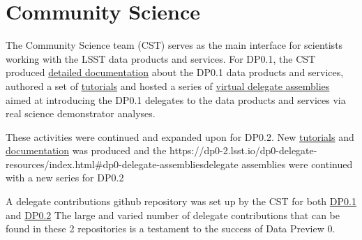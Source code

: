 \section{Community Science} \label{sec:cst}

The Community Science team (CST) serves as the main interface for scientists working with the LSST data products and services. 
For DP0.1, the CST produced \href{https://dp0-1.lsst.io/}{detailed documentation} about the DP0.1 data products and services, authored a set of \href{https://github.com/rubin-dp0/tutorial-notebooks}{tutorials} and hosted a series of \href{https://dp0-1.lsst.io/dp0-delegate-resources/index.html\#dp0-delegate-assemblies}{virtual delegate assemblies} aimed at introducing the DP0.1 delegates to the data products and services via real science demonstrator analyses.

These activities were continued and expanded upon for DP0.2. 
New \href{https://github.com/rubin-dp0/tutorial-notebooks}{tutorials} and  \href{dp0-2.lsst.io}{documentation} was produced  and the {https://dp0-2.lsst.io/dp0-delegate-resources/index.html\#dp0-delegate-assemblies}{delegate assemblies} were continued with a new series for DP0.2

A delegate contributions github repository was set up by the CST for both \href{https://github.com/rubin-dp0/delegate-contributions-dp01}{DP0.1} and \href{https://github.com/rubin-dp0/delegate-contributions-dp02}{DP0.2}
The large and varied number of delegate contributions that can be found in these 2 repositories is a testament to the success of Data Preview 0. 